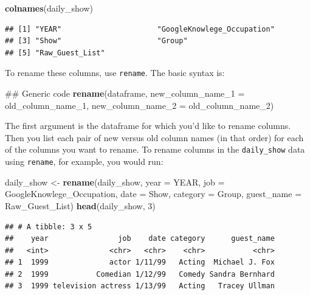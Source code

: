 \documentclass[]{book}
\makeatletter
\newenvironment{Shaded}{\begin{snugshade}}{\end{snugshade}}
\newcommand{\KeywordTok}[1]{\textcolor[rgb]{0.13,0.29,0.53}{\textbf{#1}}}
\newcommand{\DataTypeTok}[1]{\textcolor[rgb]{0.13,0.29,0.53}{#1}}
\newcommand{\DecValTok}[1]{\textcolor[rgb]{0.00,0.00,0.81}{#1}}
\newcommand{\StringTok}[1]{\textcolor[rgb]{0.31,0.60,0.02}{#1}}
\newcommand{\NormalTok}[1]{#1}
\newenvironment{kframe}{%
\medskip{}
\setlength{\fboxsep}{.8em}
 \def\at@end@of@kframe{}%
 \ifinner\ifhmode%
  \def\at@end@of@kframe{\end{minipage}}%
  \begin{minipage}{\columnwidth}%
 \fi\fi%
 \def\FrameCommand##1{\hskip\@totalleftmargin \hskip-\fboxsep
 \colorbox{shadecolor}{##1}\hskip-\fboxsep
     \hskip-\linewidth \hskip-\@totalleftmargin \hskip\columnwidth}%
 \MakeFramed {\advance\hsize-\width
   \@totalleftmargin\z@ \linewidth\hsize
   \@setminipage}}%
 {\par\unskip\endMakeFramed%
 \at@end@of@kframe}
\renewenvironment{Shaded}{\begin{kframe}}{\end{kframe}}
\theoremstyle{definition}
\theoremstyle{definition}
\theoremstyle{definition}
\theoremstyle{remark}
\makeatother
\begin{document}
\begin{Shaded}
\begin{Highlighting}[]
\KeywordTok{colnames}\NormalTok{(daily_show)}
\end{Highlighting}
\end{Shaded}

\begin{verbatim}
## [1] "YEAR"                      "GoogleKnowlege_Occupation"
## [3] "Show"                      "Group"                    
## [5] "Raw_Guest_List"
\end{verbatim}

To rename these columns, use \texttt{rename}. The basic syntax is:

\begin{Shaded}
\begin{Highlighting}[]
\NormalTok{## Generic code}
\KeywordTok{rename}\NormalTok{(dataframe, }
       \DataTypeTok{new_column_name_1 =}\NormalTok{ old_column_name_}\DecValTok{1}\NormalTok{,}
       \DataTypeTok{new_column_name_2 =}\NormalTok{ old_column_name_}\DecValTok{2}\NormalTok{)}
\end{Highlighting}
\end{Shaded}

The first argument is the dataframe for which you'd like to rename
columns. Then you list each pair of new versus old column names (in that
order) for each of the columns you want to rename. To rename columns in
the \texttt{daily\_show} data using \texttt{rename}, for example, you
would run:

\begin{Shaded}
\begin{Highlighting}[]
\NormalTok{daily_show <-}\StringTok{ }\KeywordTok{rename}\NormalTok{(daily_show,}
                     \DataTypeTok{year =}\NormalTok{ YEAR,}
                     \DataTypeTok{job =}\NormalTok{ GoogleKnowlege_Occupation, }
                     \DataTypeTok{date =}\NormalTok{ Show, }
                     \DataTypeTok{category =}\NormalTok{ Group,}
                     \DataTypeTok{guest_name =}\NormalTok{ Raw_Guest_List)}
\KeywordTok{head}\NormalTok{(daily_show, }\DecValTok{3}\NormalTok{)}
\end{Highlighting}
\end{Shaded}

\begin{verbatim}
## # A tibble: 3 x 5
##    year                job    date category      guest_name
##   <int>              <chr>   <chr>    <chr>           <chr>
## 1  1999              actor 1/11/99   Acting  Michael J. Fox
## 2  1999           Comedian 1/12/99   Comedy Sandra Bernhard
## 3  1999 television actress 1/13/99   Acting   Tracey Ullman
\end{verbatim}
\end{document}
